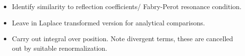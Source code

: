 \begin{itemize}
  \item Identify similarity to reflection coefficients/ Fabry-Perot resonance condition.
  \item Leave in Laplace transformed version for analytical comparisons.    
  \item {Carry out integral over position. Note divergent terms, these are cancelled out by 
    suitable renormalization.}


\end{itemize}
